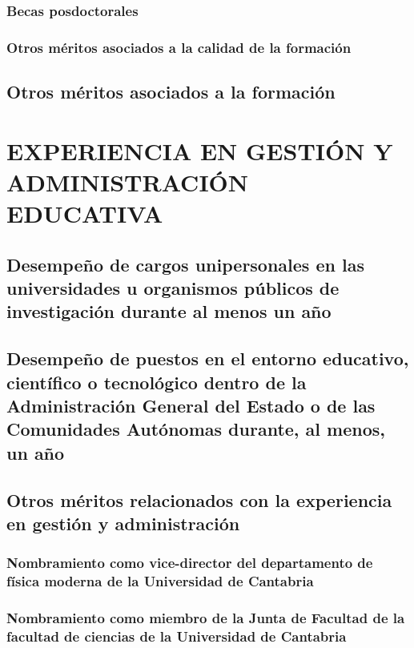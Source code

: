 \documentclass[a4paper, 11pt, twoside, openright]{report}
\begin{document}
\subsection{Becas posdoctorales}

\subsection{Otros méritos asociados a la calidad de la formación}

\section{Otros méritos asociados a la formación}
	

\chapter{EXPERIENCIA EN GESTIÓN Y ADMINISTRACIÓN EDUCATIVA}

\section{Desempeño de cargos unipersonales en las universidades u organismos públicos de investigación durante al menos un año}

\section{Desempeño de puestos en el entorno educativo, científico o tecnológico dentro de la Administración General del Estado o de las Comunidades Autónomas durante, al menos, un año}

\section{Otros méritos relacionados con la experiencia en gestión y administración}

\subsection{Nombramiento como vice-director del departamento de física moderna de la Universidad de Cantabria}

\subsection{Nombramiento como miembro de la Junta de Facultad de la facultad de ciencias de la Universidad de Cantabria}

\end{document}

